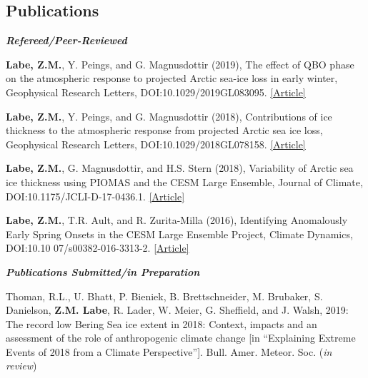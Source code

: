 \documentclass[margin,line,palatino,courier,10pt]{res}
\begin{document}
\begin{resume}
\section{\sc \large{\textcolor{Cerulean}{\textbf{Publications}}}}
\textit{\textbf{Refereed/Peer-Reviewed}}
\vspace*{-0.1in}\\
\begin{etaremune}[leftmargin=0in,topsep=0in,parsep=0in]
\item \textbf{Labe, Z.M.}, Y. Peings, and G. Magnusdottir (2019), The effect of QBO phase on the atmospheric response to projected Arctic sea-ice loss in early winter, Geophysical Research Letters, DOI:10.1029/2019GL083095. \href{https://agupubs.onlinelibrary.wiley.com/doi/10.1029/2019GL083095}{[Article]}
\item \textbf{Labe, Z.M.}, Y. Peings, and G. Magnusdottir (2018), Contributions of ice thickness to the atmospheric response from projected Arctic sea ice loss, Geophysical Research Letters, DOI:10.1029/2018GL078158. \href{https://agupubs.onlinelibrary.wiley.com/doi/10.1029/2018GL078158}{[Article]}
\item \textbf{Labe, Z.M.}, G. Magnusdottir, and H.S. Stern (2018), Variability of Arctic sea ice thickness using PIOMAS and the CESM Large Ensemble, Journal of Climate, DOI:10.1175/JCLI-D-17-0436.1. \href{https://journals.ametsoc.org/doi/abs/10.1175/JCLI-D-17-0436.1}{[Article]}
\item \textbf{Labe, Z.M.}, T.R. Ault, and R. Zurita-Milla (2016), Identifying Anomalously Early Spring Onsets in the CESM Large Ensemble Project, Climate Dynamics, DOI:10.10 07/s00382-016-3313-2. \href{http://link.springer.com/article/10.1007/s00382-016-3313-2}{[Article]}
\end{etaremune}

\textit{\textbf{Publications Submitted/in Preparation}}
\vspace*{-0.1in}\\
\begin{etaremune}[leftmargin=0in,topsep=0in,parsep=0in]
\item Thoman, R.L., U. Bhatt, P. Bieniek, B. Brettschneider, M. Brubaker, S. Danielson, \textbf{Z.M. Labe}, R. Lader, W. Meier, G. Sheffield, and J. Walsh, 2019: The record low Bering Sea ice extent in 2018: Context, impacts and an assessment of the role of anthropogenic climate change [in ``Explaining Extreme Events of 2018 from a Climate Perspective'']. Bull. Amer. Meteor. Soc. (\textit{in review})
\end{etaremune}


\end{resume}
\end{document}
